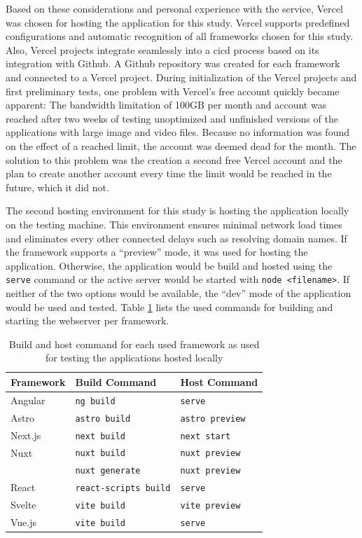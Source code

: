 \documentclass[a4paper, 10pt]{article}
\begin{document}
Based on these considerations and personal experience with the service, Vercel was chosen for hosting the application for this study.
Vercel supports predefined configurations and automatic recognition of all frameworks chosen for this study.
Also, Vercel projects integrate seamlessly into a \acrshort{cicd} process based on its integration with Github.
A Github repository was created for each framework and connected to a Vercel project.
During initialization of the Vercel projects and first preliminary tests, one problem with Vercel's free account quickly became apparent:
The bandwidth limitation of 100GB per month and account was reached after two weeks of testing unoptimized and unfinished versions of the applications with large image and video files.
Because no information was found on the effect of a reached limit, the account was deemed dead for the month.
The solution to this problem was the creation a second free Vercel account and the plan to create another account every time the limit would be reached in the future, which it did not.

The second hosting environment for this study is hosting the application locally on the testing machine.
This environment ensures minimal network load times and eliminates every other connected delays such as resolving domain names.
If the framework supports a \enquote{preview} mode, it was used for hosting the application.
Otherwise, the application would be build and hosted using the \verb|serve| command or the active server would be started with \verb|node <filename>|.
If neither of the two options would be available, the \enquote{dev} mode of the application would be used and tested.
Table \ref{tab:hostCommands} lists the used commands for building and starting the webserver per framework.

\begin{table}
\begin{center}
  \begin{tabular}[h]{| l | l | l |}
    \hline
    \textbf{Framework} & \textbf{Build Command} & \textbf{Host Command} \\ \hline
    Angular & \verb|ng build| & \verb|serve| \\ \hline
    Astro & \verb|astro build| & \verb|astro preview| \\ \hline
    Next.js & \verb|next build| & \verb|next start| \\ \hline
    Nuxt & \verb|nuxt build| & \verb|nuxt preview| \\
     & \verb|nuxt generate| & \verb|nuxt preview| \\ \hline
    React & \verb|react-scripts build| & \verb|serve| \\ \hline
    Svelte & \verb|vite build| & \verb|vite preview| \\ \hline
    Vue.js & \verb|vite build| & \verb|serve| \\ \hline
  \end{tabular}
\end{center}
\caption{Build and host command for each used framework as used for testing the applications hosted locally}\label{tab:hostCommands}
\end{table}
\end{document}
